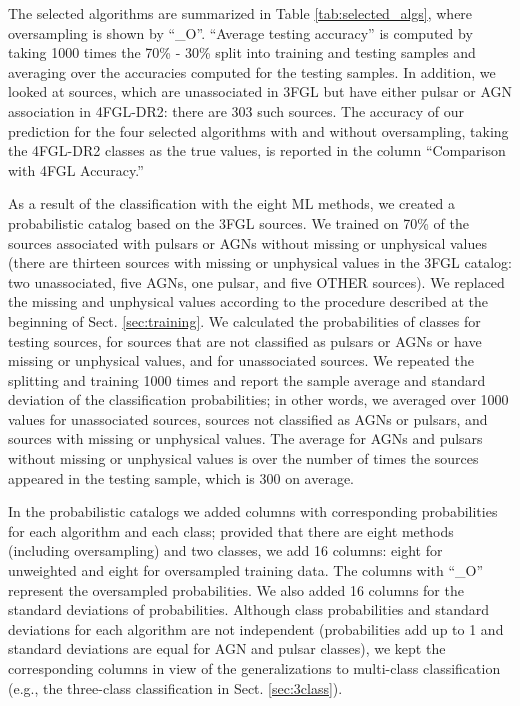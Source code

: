 \documentclass[referee]{aa} %
\begin{document}
The selected algorithms are summarized in Table \ref{tab:selected_algs}, where oversampling is shown by ``\_O''.
``Average testing accuracy'' is computed by taking 1000 times the 70\% - 30\% split into training and testing samples and averaging over the 
accuracies computed for the testing samples.
In addition, we looked at sources, which are unassociated in 3FGL but have either pulsar or AGN association in 4FGL-DR2: there are 303 such sources.
The accuracy of our prediction for the four selected algorithms with and without oversampling, taking the 4FGL-DR2 classes as the true values, is reported in the column ``Comparison with 4FGL Accuracy.''

As a result of the classification with the eight ML methods,
we created a probabilistic catalog based on the 3FGL sources.
We trained on 70\% of the sources associated with pulsars or AGNs without missing or unphysical values 
(there are thirteen sources with missing or unphysical values in the 3FGL catalog: two unassociated, five AGNs, one pulsar, and five OTHER sources).
We replaced the missing and unphysical values according to the procedure described at the beginning of Sect. \ref{sec:training}.
We calculated the probabilities of classes for testing sources, for sources that are not classified as pulsars or AGNs or have missing or unphysical values, and for unassociated sources.
We repeated the splitting and training 1000 times and report the sample average and standard deviation of the classification probabilities; in other words, we averaged over 1000 values for unassociated sources, sources not classified as AGNs or pulsars, and sources with missing or unphysical values. The average for AGNs and pulsars without missing or unphysical values is over the number of times the sources appeared in the testing sample, which is 300 on average.


In the probabilistic catalogs we added columns with corresponding probabilities for each algorithm and each class; provided that there are eight methods (including oversampling) and two classes, we add 16 columns: eight for unweighted and eight for oversampled training data. The columns with ``\_O'' represent the oversampled probabilities. We also added 16 columns for the standard deviations of probabilities. Although class probabilities and standard deviations for each algorithm are not independent (probabilities add up to 1 and standard deviations are equal for AGN and pulsar classes), we kept the corresponding columns in view of the generalizations to multi-class classification (e.g., the three-class classification in Sect. \ref{sec:3class}).
\end{document}
